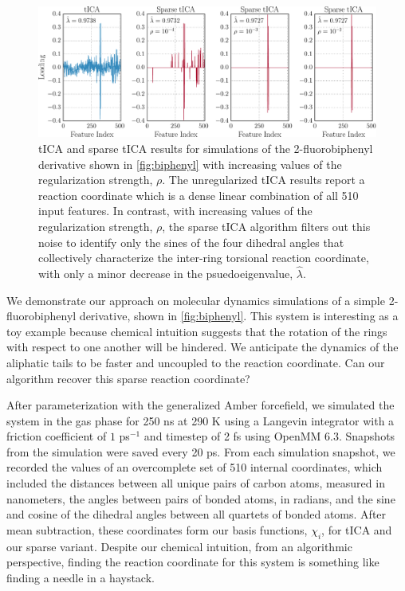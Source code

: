 \documentclass[aip, jcp, reprint, nolinenumbers, twocolumn, nobalancelastpage, nofootinbib]{revtex4-1}
\begin{document}
\begin{figure}
\centering
\includegraphics[width=\textwidth]{tics-crop.pdf}
\onecolumngrid
\caption{\label{fig:biphenyl-sparsetica} tICA and sparse tICA results for simulations of the 2-fluorobiphenyl derivative shown in \cref{fig:biphenyl} with increasing values of the regularization strength, $\rho$. The unregularized tICA results report a reaction coordinate which is a dense linear combination of all 510 input features. In contrast, with increasing values of the regularization strength, $\rho$, the sparse tICA algorithm filters out this noise to identify only the sines of the four dihedral angles that collectively characterize the inter-ring torsional reaction coordinate, with only a minor decrease in the psuedoeigenvalue, $\hat{\lambda}$.}
\end{figure}

We demonstrate our approach on molecular dynamics simulations of a  simple 2-fluorobiphenyl derivative, shown in \cref{fig:biphenyl}. This system is interesting as a toy example because chemical intuition suggests that the rotation of the rings with respect to one another will be hindered. We anticipate the dynamics of the aliphatic tails to be faster and uncoupled to the reaction coordinate. Can our algorithm recover this sparse reaction coordinate?

After parameterization with the generalized Amber forcefield,\cite{wang2004development} we simulated the system in the gas phase for 250 ns at 290 K using a Langevin integrator with a friction coefficient of $1$ ps$^{-1}$ and timestep of 2 fs using OpenMM 6.3.\cite{eastman2013openmm} Snapshots from the simulation were saved every 20 ps. From each simulation snapshot, we recorded the values of an overcomplete set of 510 internal coordinates, which included the distances between all unique pairs of carbon atoms, measured in nanometers, the angles between pairs of bonded atoms, in radians, and the sine and cosine of the dihedral angles between all quartets of bonded atoms. After mean subtraction, these coordinates form our basis functions, $\chi_i$, for tICA and our sparse variant. Despite our chemical intuition, from an algorithmic perspective, finding the reaction coordinate for this system is something like finding a needle in a haystack.
\end{document}
